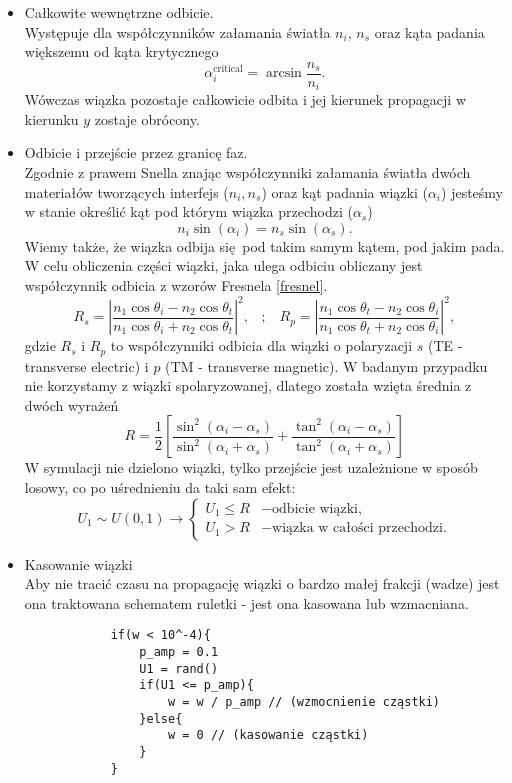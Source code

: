 \documentclass[a4paper, 12pt]{article}
\begin{document}
	\begin{itemize}
		\item Całkowite wewnętrzne odbicie.
		\\ Występuje dla współczynników załamania światła $n_i$, $n_s$ oraz kąta padania większemu od kąta krytycznego 
		\begin{equation}
			\alpha_i^{\text{critical}} = \arcsin\frac{n_s}{n_i}.
		\end{equation}
		Wówczas wiązka pozostaje całkowicie odbita i jej kierunek propagacji w kierunku $y$ zostaje obrócony.
		\item Odbicie i przejście przez granicę faz.
		\\
		Zgodnie z prawem Snella znając współczynniki załamania światła dwóch materiałów tworzących interfejs ($n_i,n_s$) oraz kąt padania wiązki ($\alpha_i$) jesteśmy w stanie określić kąt pod którym wiązka przechodzi ($\alpha_s$)
		\[n_i \sin(\alpha_i) = n_s\sin(\alpha_s). \]
		Wiemy także, że wiązka odbija się pod takim samym kątem, pod jakim pada.
		W celu obliczenia części wiązki, jaka ulega odbiciu obliczany jest współczynnik odbicia z wzorów Fresnela \eqref{fresnel}.
		\begin{equation}
			R_s = \left|\frac{n_1\cos\theta_i - n_2\cos\theta_t}{n_1\cos\theta_i + n_2\cos\theta_t}\right|^2, \; \; \; ; \; \; \; 
			R_p = \left|\frac{n_1\cos\theta_t - n_2\cos\theta_i}{n_1\cos\theta_t + n_2\cos\theta_i}\right|^2,
			\label{fresnel}
		\end{equation} 
		gdzie $R_s$ i $R_p$ to współczynniki odbicia dla wiązki o polaryzacji $s$ (TE - transverse electric) i $p$ (TM - transverse magnetic). 
		W badanym przypadku nie korzystamy z wiązki spolaryzowanej, dlatego została wzięta średnia z dwóch wyrażeń
		\begin{equation}
			R = \frac{1}{2} \left[\frac{\sin^2(\alpha_i-\alpha_s)}{\sin^2(\alpha_i+\alpha_s)} + \frac{\tan^2(\alpha_i-\alpha_s)}{\tan^2(\alpha_i+\alpha_s)}\right]
		\end{equation}
		W symulacji nie dzielono wiązki, tylko przejście jest uzależnione w sposób losowy, co po uśrednieniu da taki sam efekt:
		\begin{equation}
			U_1 \sim U(0,1) \rightarrow \begin{cases}
				U_1 \leq R  & - \text{odbicie wiązki},\\
				U_1 > R & - \text{wiązka w całości przechodzi}.
			\end{cases}
		\end{equation}
		\item Kasowanie wiązki
		\\ 
		Aby nie tracić czasu na propagację wiązki o bardzo małej frakcji (wadze) jest ona traktowana schematem ruletki - jest ona kasowana lub wzmacniana. 
		\begin{verbatim}
			if(w < 10^-4){
				p_amp = 0.1
				U1 = rand()
				if(U1 <= p_amp){
					w = w / p_amp // (wzmocnienie cząstki)
				}else{
					w = 0 // (kasowanie cząstki)
				}
			}
		\end{verbatim}
	\end{itemize}
	
\end{document}
